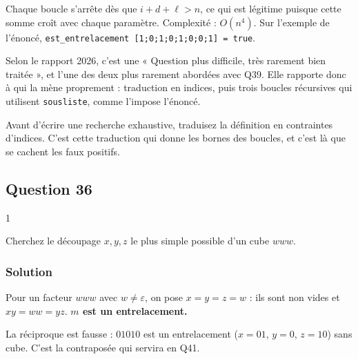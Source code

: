 \documentclass[11pt,a4paper]{article}
\begin{document}
Chaque boucle s'arrête dès que \(i+d+\ell>n\), ce qui est légitime puisque cette somme croît avec chaque paramètre. Complexité : \(O(n^4)\). Sur l'exemple de l'énoncé, \texttt{est\_entrelacement\ {[}1;\allowbreak{}0;\allowbreak{}1;\allowbreak{}0;\allowbreak{}1;\allowbreak{}0;\allowbreak{}0;\allowbreak{}1{]}\allowbreak{}\ =\allowbreak{}\ true}.

\begin{jury}

Selon le rapport 2026, c'est une « Question plus difficile, très rarement bien traitée », et l'une des deux plus rarement abordées avec Q39. Elle rapporte donc à qui la mène proprement : traduction en indices, puis trois boucles récursives qui utilisent \texttt{sousliste}, comme l'impose l'énoncé.

\end{jury}

\begin{methode}

Avant d'écrire une recherche exhaustive, traduisez la définition en contraintes d'indices. C'est cette traduction qui donne les bornes des boucles, et c'est là que se cachent les faux positifs.

\end{methode}

\hypertarget{question-36}{%
\subsection{Question 36}\label{question-36}}

\begin{indication}{1}

Cherchez le découpage \(x,y,z\) le plus simple possible d'un cube \(www\).

\end{indication}

\hypertarget{solution-35}{%
\subsubsection{Solution}\label{solution-35}}

Pour un facteur \(www\) avec \(w\neq\varepsilon\), on pose \(x=y=z=w\) : ils sont non vides et \(xy=ww=yz\). \textbf{\(m\) est un entrelacement.}

\begin{piege}

La réciproque est fausse : \(01010\) est un entrelacement (\(x=01\), \(y=0\), \(z=10\)) sans cube. C'est la contraposée qui servira en Q41.

\end{piege}
\end{document}

